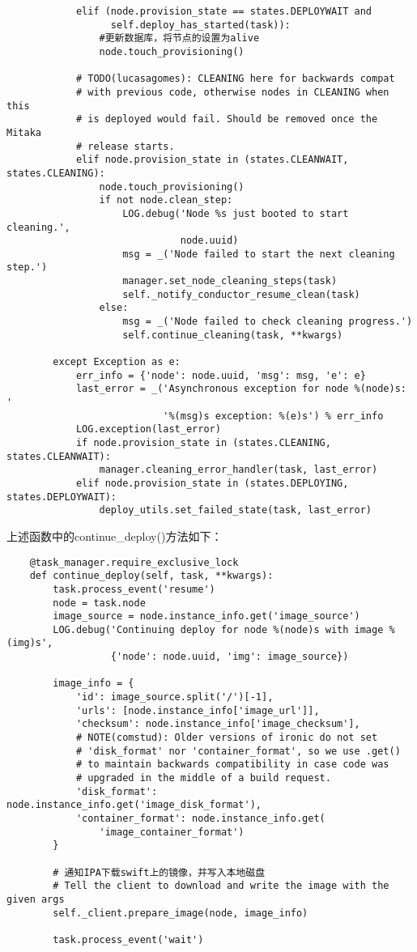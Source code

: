 \documentclass[a4paper,left=2.5cm,right=2.5cm,11pt]{article}
\begin{document}
\begin{lstlisting}
            elif (node.provision_state == states.DEPLOYWAIT and
                  self.deploy_has_started(task)):
				#更新数据库，将节点的设置为alive
                node.touch_provisioning()  

            # TODO(lucasagomes): CLEANING here for backwards compat
            # with previous code, otherwise nodes in CLEANING when this
            # is deployed would fail. Should be removed once the Mitaka
            # release starts.
            elif node.provision_state in (states.CLEANWAIT, states.CLEANING):
                node.touch_provisioning()
                if not node.clean_step:
                    LOG.debug('Node %s just booted to start cleaning.',
                              node.uuid)
                    msg = _('Node failed to start the next cleaning step.')
                    manager.set_node_cleaning_steps(task)
                    self._notify_conductor_resume_clean(task)
                else:
                    msg = _('Node failed to check cleaning progress.')
                    self.continue_cleaning(task, **kwargs)

        except Exception as e:
            err_info = {'node': node.uuid, 'msg': msg, 'e': e}
            last_error = _('Asynchronous exception for node %(node)s: '
                           '%(msg)s exception: %(e)s') % err_info
            LOG.exception(last_error)
            if node.provision_state in (states.CLEANING, states.CLEANWAIT):
                manager.cleaning_error_handler(task, last_error)
            elif node.provision_state in (states.DEPLOYING, states.DEPLOYWAIT):
                deploy_utils.set_failed_state(task, last_error)
	\end{lstlisting}

	上述函数中的continue\_deploy()方法如下：
	\begin{lstlisting}
	@task_manager.require_exclusive_lock
    def continue_deploy(self, task, **kwargs):
        task.process_event('resume')
        node = task.node
        image_source = node.instance_info.get('image_source')
        LOG.debug('Continuing deploy for node %(node)s with image %(img)s',
                  {'node': node.uuid, 'img': image_source})

        image_info = {
            'id': image_source.split('/')[-1],
            'urls': [node.instance_info['image_url']],
            'checksum': node.instance_info['image_checksum'],
            # NOTE(comstud): Older versions of ironic do not set
            # 'disk_format' nor 'container_format', so we use .get()
            # to maintain backwards compatibility in case code was
            # upgraded in the middle of a build request.
            'disk_format': node.instance_info.get('image_disk_format'),
            'container_format': node.instance_info.get(
                'image_container_format')
        }

        # 通知IPA下载swift上的镜像，并写入本地磁盘
        # Tell the client to download and write the image with the given args
        self._client.prepare_image(node, image_info)

        task.process_event('wait')
	\end{lstlisting}
\end{document}
